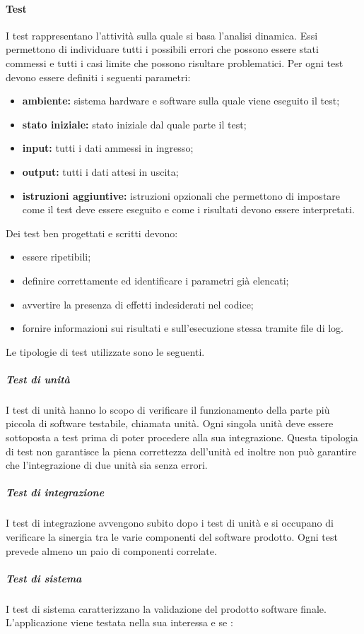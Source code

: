 \paragraph{Test}
I test rappresentano l'attività sulla quale si basa l'analisi dinamica. Essi permettono di individuare tutti i possibili errori che possono essere stati commessi e tutti i casi limite che possono risultare problematici. Per ogni test devono essere definiti i seguenti parametri:
\begin{itemize}
	\item \textbf{ambiente:} sistema hardware e software sulla quale viene eseguito il test;
	\item \textbf{stato iniziale:} stato iniziale dal quale parte il test;
	\item \textbf{input:} tutti i dati ammessi in ingresso;
	\item \textbf{output:} tutti i dati attesi in uscita;
	\item \textbf{istruzioni aggiuntive:} istruzioni opzionali che permettono di impostare come il test deve essere eseguito e come i risultati devono essere interpretati.
\end{itemize}
Dei test ben progettati e scritti devono:
\begin{itemize}
	\item essere ripetibili;
	\item definire correttamente ed identificare i parametri già elencati;
	\item avvertire la presenza di effetti indesiderati nel codice;
	\item fornire informazioni sui risultati e sull'esecuzione stessa tramite file di log.
\end{itemize}
Le tipologie di test utilizzate sono le seguenti.
\subparagraph{Test di unità}
I test di unità hanno lo scopo di verificare il funzionamento della parte più piccola di software testabile, chiamata unità. Ogni singola unità deve essere sottoposta a test prima di poter procedere alla sua integrazione. Questa tipologia di test non garantisce la piena correttezza dell'unità ed inoltre non può garantire che l'integrazione di due unità sia senza errori.
\subparagraph{Test di integrazione}
I test di integrazione avvengono subito dopo i test di unità e si occupano di verificare la sinergia tra le varie componenti del software prodotto. Ogni test prevede almeno un paio di componenti correlate.
\subparagraph{Test di sistema}
I test di sistema caratterizzano la validazione del prodotto software finale. L'applicazione viene testata nella sua interessa e se :
